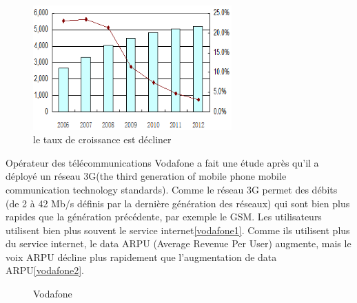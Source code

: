       \begin{figure}[H]
          \centering
          \includegraphics[width=3in]{images/1.png}
          \caption{le taux de croissance est décliner}
          \label{tauxdecroissance}
      \end{figure}
Opérateur des télécommunications Vodafone a fait une étude après qu'il a déployé un réseau 3G(\textsf{the third generation of mobile phone mobile communication technology standards}). Comme le réseau 3G permet des débits (de 2 à 42 Mb/s définis par la dernière génération des réseaux) qui sont bien plus rapides que la génération précédente, par exemple le GSM. Les utilisateurs utilisent bien plus souvent le service internet\ref{vodafone1}. Comme ils utilisent plus du service internet, le data ARPU (Average Revenue Per User) augmente, mais le voix ARPU décline plus rapidement que l'augmentation de data ARPU\ref{vodafone2}. 
 \begin{figure}[H]
 	\flushleft
 	 	\hfill
 	\hspace{1in}	 
 	\caption{Vodafone} 
 \end{figure}
 
